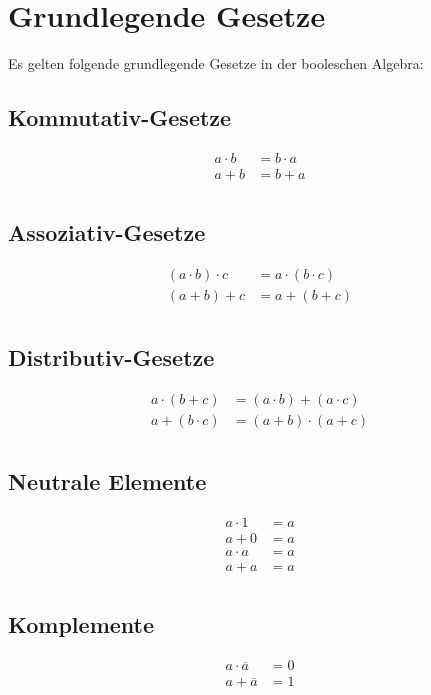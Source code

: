 \section{Grundlegende Gesetze}
Es gelten folgende grundlegende Gesetze in der booleschen Algebra:

\subsection*{Kommutativ-Gesetze}
\begin{align*}
	a \cdot b & = b \cdot a \\
	a + b & = b + a \\
\end{align*}

\subsection*{Assoziativ-Gesetze}
\begin{align*}
	(a \cdot b) \cdot c & = a \cdot (b \cdot c) \\
	(a + b) + c & = a + (b + c) \\
\end{align*}

\subsection*{Distributiv-Gesetze}
\begin{align*}
	a \cdot (b + c) & = (a \cdot b) + (a \cdot c) \\
	a + (b \cdot c) & = (a + b) \cdot (a + c) \\
\end{align*}

\subsection*{Neutrale Elemente}
\begin{align*}
	a \cdot 1 & = a \\
		a + 0 & = a \\
	a \cdot a & = a \\
		a + a & = a \\
\end{align*}

\subsection*{Komplemente}
\begin{align*}
	a \cdot \overline{a} & = 0 \\
		a + \overline{a} & = 1 \\
\end{align*}

